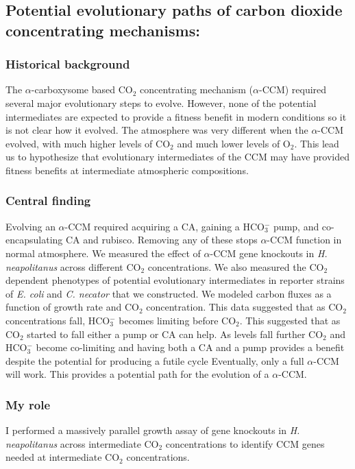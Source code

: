 \documentclass{article}
\begin{document}

\newrefsection
\subsection{Potential evolutionary paths of carbon dioxide concentrating mechanisms:}\label{CCM_EVO}
\subsubsection{Historical background}
The $\alpha$-carboxysome based CO$_2$ concentrating mechanism ($\alpha$-CCM) required several major evolutionary steps to evolve.
However, none of the potential intermediates are expected to provide a fitness benefit in modern conditions so it is not clear how it evolved.
The atmosphere was very different when the $\alpha$-CCM evolved, with much higher levels of CO$_2$ and much lower levels of O$_2$.
This lead us to hypothesize that evolutionary intermediates of the CCM may have provided fitness benefits at intermediate atmospheric compositions.
%
\subsubsection{Central finding}
Evolving an $\alpha$-CCM required acquiring a CA, gaining a HCO$_{3}^{-}$ pump, and co-encapsulating CA and rubisco. 
Removing any of these stops $\alpha$-CCM function in normal atmosphere.
We measured the effect of $\alpha$-CCM gene knockouts in \textit{H. neapolitanus} across different CO$_2$ concentrations.
We also measured  the CO$_2$ dependent phenotypes of potential evolutionary intermediates in reporter strains of \textit{E. coli} and \textit{C. necator} that we constructed.
We modeled carbon fluxes as a function of growth rate and CO$_2$ concentration.
This data suggested that as CO$_2$ concentrations fall, HCO$_{3}^{-}$ becomes limiting before CO$_2$.
This suggested that as CO$_2$ started to fall either a pump or CA can help.
As levels fall further CO$_2$ and HCO$_{3}^{-}$ become co-limiting and having both a CA and a pump provides a benefit despite the potential for producing a futile cycle
Eventually, only a full $\alpha$-CCM will work.
This provides a potential path for the evolution of a $\alpha$-CCM.
%
\subsubsection{My role}
I performed a massively parallel growth assay of gene knockouts in \textit{H. neapolitanus} across intermediate CO$_2$ concentrations to identify CCM genes needed at intermediate CO$_2$ concentrations.
%
\end{document}
